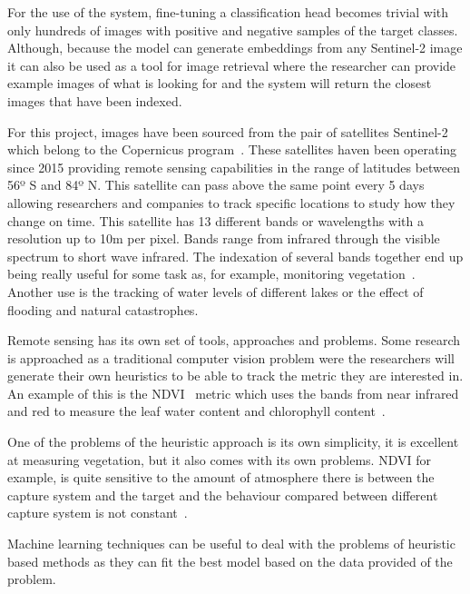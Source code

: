 \documentclass[conference]{IEEEtran}
\begin{document}
    For the use of the system, fine-tuning a classification head becomes trivial with only hundreds of images with positive and negative
    samples of the target classes.
    Although, because the model can generate embeddings from any Sentinel-2 image it can also be used as a tool for image retrieval
    where the researcher can provide example images of what is looking for and the system will return the closest images that
    have been indexed.

    For this project, images have been sourced from the pair of satellites Sentinel-2~\cite{sentinel-2} which belong to the Copernicus program~\cite{whatiscopernicus}.
    These satellites haven been operating since 2015 providing remote sensing capabilities in the range of latitudes between 56º S and 84º N\@.
    This satellite can pass above the same point every 5 days allowing researchers and companies to track specific locations
    to study how they change on time.
    This satellite has 13 different bands or wavelengths with a resolution up to 10m per pixel.
    Bands range from infrared through the visible spectrum to short wave infrared.
    The indexation of several bands together end up being really useful for some task as, for example, monitoring vegetation~\cite{TUCKER1979127}.
    Another use is the tracking of water levels of different lakes or the effect of flooding and natural catastrophes.

    Remote sensing has its own set of tools, approaches and problems.
    Some research is approached as a traditional computer vision problem were the researchers will
    generate their own heuristics to be able to track the metric they are interested in.
    An example of this is the NDVI~\cite{NDVIsource} metric which uses the bands from near infrared and red to
    measure the leaf water content and chlorophyll content~\cite{TUCKER1979127}.

    One of the problems of the heuristic approach is its own simplicity, it is excellent at measuring
    vegetation, but it also comes with its own problems.
    NDVI for example, is quite sensitive to the amount of atmosphere there is between the capture system and the target and
    the behaviour compared between different capture system is not constant~\cite{Huang2021}.

    Machine learning techniques can be useful to deal with the problems of heuristic based methods as they can fit the best model
    based on the data provided of the problem.
\end{document}
